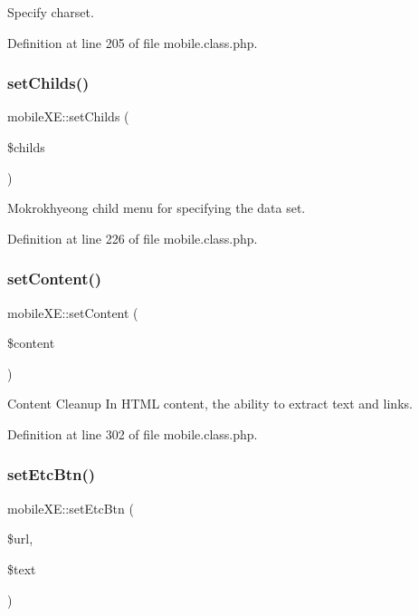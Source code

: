 Specify charset. 



Definition at line 205 of file mobile.\+class.\+php.

\hypertarget{classmobileXE_a0ea0dec157552b699d23388b257d22a6}{}\label{classmobileXE_a0ea0dec157552b699d23388b257d22a6} 
\subsubsection{\texorpdfstring{set\+Childs()}{setChilds()}}
{\footnotesize\ttfamily mobile\+X\+E\+::set\+Childs (\begin{DoxyParamCaption}\item[{}]{\$childs }\end{DoxyParamCaption})}



Mokrokhyeong child menu for specifying the data set. 



Definition at line 226 of file mobile.\+class.\+php.

\hypertarget{classmobileXE_a1f6fe02e3cf472097a66d95b09dfaeae}{}\label{classmobileXE_a1f6fe02e3cf472097a66d95b09dfaeae} 
\subsubsection{\texorpdfstring{set\+Content()}{setContent()}}
{\footnotesize\ttfamily mobile\+X\+E\+::set\+Content (\begin{DoxyParamCaption}\item[{}]{\$content }\end{DoxyParamCaption})}



Content Cleanup In H\+T\+ML content, the ability to extract text and links. 



Definition at line 302 of file mobile.\+class.\+php.

\hypertarget{classmobileXE_aed1255190e5d085529facbc6f5e79335}{}\label{classmobileXE_aed1255190e5d085529facbc6f5e79335} 
\subsubsection{\texorpdfstring{set\+Etc\+Btn()}{setEtcBtn()}}
{\footnotesize\ttfamily mobile\+X\+E\+::set\+Etc\+Btn (\begin{DoxyParamCaption}\item[{}]{\$url,  }\item[{}]{\$text }\end{DoxyParamCaption})}



